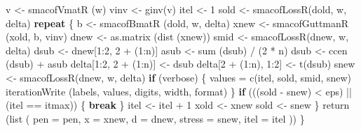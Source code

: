 \documentclass[
  12pt,
]{book}
\newenvironment{Shaded}{\begin{snugshade}}{\end{snugshade}}
\newcommand{\AttributeTok}[1]{\textcolor[rgb]{0.77,0.63,0.00}{#1}}
\newcommand{\ControlFlowTok}[1]{\textcolor[rgb]{0.13,0.29,0.53}{\textbf{#1}}}
\newcommand{\DecValTok}[1]{\textcolor[rgb]{0.00,0.00,0.81}{#1}}
\newcommand{\FunctionTok}[1]{\textcolor[rgb]{0.00,0.00,0.00}{#1}}
\newcommand{\NormalTok}[1]{#1}
\newcommand{\OtherTok}[1]{\textcolor[rgb]{0.56,0.35,0.01}{#1}}
\newcommand{\SpecialCharTok}[1]{\textcolor[rgb]{0.00,0.00,0.00}{#1}}
\theoremstyle{definition}
\theoremstyle{definition}
\theoremstyle{definition}
\theoremstyle{definition}
\theoremstyle{remark}
\begin{document}
\begin{Shaded}
\begin{Highlighting}[]
\NormalTok{    v }\OtherTok{\textless{}{-}} \FunctionTok{smacofVmatR}\NormalTok{ (w)}
\NormalTok{    vinv }\OtherTok{\textless{}{-}} \FunctionTok{ginv}\NormalTok{(v)}
\NormalTok{    itel }\OtherTok{\textless{}{-}} \DecValTok{1}
\NormalTok{    sold }\OtherTok{\textless{}{-}} \FunctionTok{smacofLossR}\NormalTok{(dold, w, delta)}
    \ControlFlowTok{repeat}\NormalTok{ \{}
\NormalTok{      b }\OtherTok{\textless{}{-}} \FunctionTok{smacofBmatR}\NormalTok{ (dold, w, delta)}
\NormalTok{      xnew }\OtherTok{\textless{}{-}} \FunctionTok{smacofGuttmanR}\NormalTok{ (xold, b, vinv)}
\NormalTok{      dnew }\OtherTok{\textless{}{-}} \FunctionTok{as.matrix}\NormalTok{ (}\FunctionTok{dist}\NormalTok{ (xnew))}
\NormalTok{      smid }\OtherTok{\textless{}{-}} \FunctionTok{smacofLossR}\NormalTok{(dnew, w, delta)}
\NormalTok{      dsub }\OtherTok{\textless{}{-}}\NormalTok{ dnew[}\DecValTok{1}\SpecialCharTok{:}\DecValTok{2}\NormalTok{, }\DecValTok{2} \SpecialCharTok{+}\NormalTok{ (}\DecValTok{1}\SpecialCharTok{:}\NormalTok{n)]}
\NormalTok{      asub }\OtherTok{\textless{}{-}} \FunctionTok{sum}\NormalTok{ (dsub) }\SpecialCharTok{/}\NormalTok{ (}\DecValTok{2} \SpecialCharTok{*}\NormalTok{ n)}
\NormalTok{      dsub }\OtherTok{\textless{}{-}} \FunctionTok{ccen}\NormalTok{ (dsub) }\SpecialCharTok{+}\NormalTok{ asub}
\NormalTok{      delta[}\DecValTok{1}\SpecialCharTok{:}\DecValTok{2}\NormalTok{, }\DecValTok{2} \SpecialCharTok{+}\NormalTok{ (}\DecValTok{1}\SpecialCharTok{:}\NormalTok{n)] }\OtherTok{\textless{}{-}}\NormalTok{ dsub}
\NormalTok{      delta[}\DecValTok{2} \SpecialCharTok{+}\NormalTok{ (}\DecValTok{1}\SpecialCharTok{:}\NormalTok{n), }\DecValTok{1}\SpecialCharTok{:}\DecValTok{2}\NormalTok{] }\OtherTok{\textless{}{-}} \FunctionTok{t}\NormalTok{(dsub)}
\NormalTok{      snew }\OtherTok{\textless{}{-}} \FunctionTok{smacofLossR}\NormalTok{(dnew, w, delta)}
      \ControlFlowTok{if}\NormalTok{ (verbose) \{}
\NormalTok{        values }\OtherTok{=} \FunctionTok{c}\NormalTok{(itel, sold, smid, snew)}
        \FunctionTok{iterationWrite}\NormalTok{ (labels, values, digits, width, format)}
\NormalTok{      \}}
      \ControlFlowTok{if}\NormalTok{ (((sold }\SpecialCharTok{{-}}\NormalTok{ snew) }\SpecialCharTok{\textless{}}\NormalTok{ eps) }\SpecialCharTok{||}\NormalTok{ (itel }\SpecialCharTok{==}\NormalTok{ itmax)) \{}
        \ControlFlowTok{break}
\NormalTok{      \}}
\NormalTok{      itel }\OtherTok{\textless{}{-}}\NormalTok{ itel }\SpecialCharTok{+} \DecValTok{1}
\NormalTok{      xold }\OtherTok{\textless{}{-}}\NormalTok{ xnew}
\NormalTok{      sold }\OtherTok{\textless{}{-}}\NormalTok{ snew}
\NormalTok{    \}}
    \FunctionTok{return}\NormalTok{ (}\FunctionTok{list}\NormalTok{ (}
      \AttributeTok{pen =}\NormalTok{ pen,}
      \AttributeTok{x =}\NormalTok{ xnew,}
      \AttributeTok{d =}\NormalTok{ dnew,}
      \AttributeTok{stress =}\NormalTok{ snew,}
      \AttributeTok{itel =}\NormalTok{ itel}
\NormalTok{    ))}
\NormalTok{  \}}
\end{Highlighting}
\end{Shaded}
\end{document}
